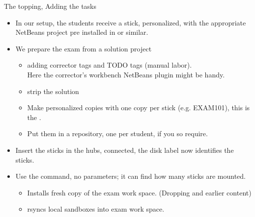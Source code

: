 \begin{frame}{The topping, Adding the tasks}
  \begin{itemize}
  \item In our setup, the students receive a stick, personalized, with
    the appropriate NetBeans project pre installed in
     or similar.
  \item We prepare the exam from a solution project
    \begin{itemize}
    \item adding corrector tags and TODO tags (manual labor).\\
      Here the corrector's workbench NetBeans plugin might be handy.
    \item strip the solution
    \item Make personalized copies with one copy per stick
      (e.g. EXAM101), this is the .
    \item Put them in a repository, one per student, if you so require.
    \end{itemize}

  \item Insert the sticks in the hubs, connected, the disk label now identifies the sticks.
  \item Use the  command, no parameters; it can find
    how many sticks are mounted.
    \begin{itemize}
    \item Installs fresh copy of the exam work space. (Dropping and
      earlier content)
    \item rsyncs local sandboxes into exam work space.
    \end{itemize}
  \end{itemize}
\end{frame}

